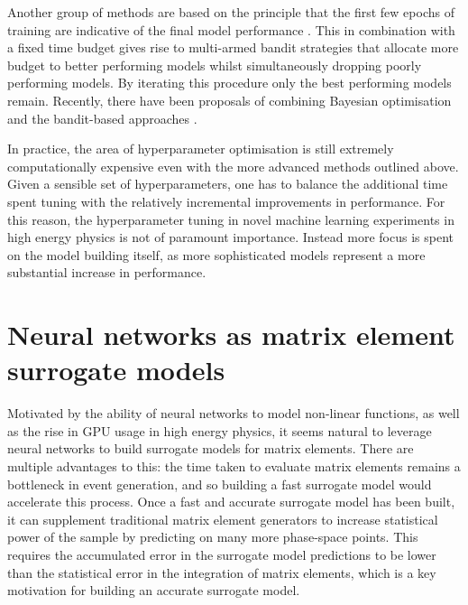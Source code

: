 \documentclass[main.tex]{subfiles}
\begin{document}
    Another group of methods are based on the principle
    that the first few epochs of training are indicative
    of the final model performance \cite{pmlr-v28-bubeck13}. This in combination
    with a fixed time budget gives rise to multi-armed
    bandit strategies \cite{jamieson2016non,li2017hyperband}
    that allocate more budget to better
    performing models whilst simultaneously dropping poorly
    performing models. By iterating this procedure only the 
    best performing models remain. Recently, there have
    been proposals of combining Bayesian optimisation and
    the bandit-based approaches \cite{falkner2018bohb}.
    
    In practice, the area of hyperparameter optimisation
    is still extremely computationally expensive even with
    the more advanced methods outlined above. Given a sensible set of hyperparameters,
    one has to balance the additional time spent tuning with the
    relatively incremental improvements in performance. For this reason,
    the hyperparameter tuning in novel machine learning experiments
    in high energy physics is not of paramount importance.
    Instead more focus is spent on the model building itself, as
    more sophisticated models represent a more substantial increase
    in performance.

\section{Neural networks as matrix element surrogate models}\label{sec:NN_ME}
    Motivated by the ability of neural networks to
    model non-linear functions, as well as the rise
    in GPU usage in high energy physics, it seems
    natural to leverage neural networks to build surrogate
    models for matrix elements. There are multiple advantages
    to this: the time taken to evaluate matrix elements remains
    a bottleneck in event generation, and so building a
    fast surrogate model would accelerate this process.
    Once a fast and accurate surrogate model has been
    built, it can supplement traditional matrix
    element generators to increase statistical power of the sample
    by predicting on many more phase-space points. This
    requires the accumulated error in the surrogate model
    predictions to be lower than the statistical error in the
    integration of matrix elements, which is a key motivation
    for building an accurate surrogate model.
\end{document}
